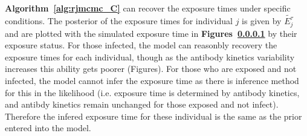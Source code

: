 \documentclass{article}
\begin{document}
\paragraph{} \textbf{Algorithm~\ref{alg:rjmcmc_C}} can recover the exposure times under specific conditions. The posterior of the exposure times for individual $j$ is given by $\tilde{E^\tau_j}$ and are plotted with the simulated exposure time in \textbf{Figures~\ref{} } by their exposure status. For those infected, the model can reasonbly recovery the exposure times for each individual, though as the antibody kinetics variability increases this ability gets poorer (Figures). For those who are exposed and not infected, the model cannot infer the exposure time as there is inference method for this in the likelihood (i.e. exposure time is determined by antibody kinetics, and antibdy kinetics remain unchanged for those exposed and not infect). Therefore the infered exposure time for these individual is the same as the prior entered into the model. 
\end{document}

